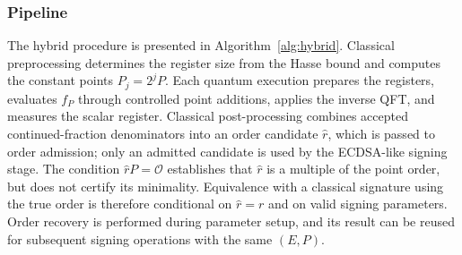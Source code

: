 \subsubsection{Pipeline}

\begin{revision}
The hybrid procedure is presented in Algorithm~\ref{alg:hybrid}. Classical preprocessing determines the register size from the Hasse bound and computes the constant points $P_j=2^jP$. Each quantum execution prepares the registers, evaluates $f_P$ through controlled point additions, applies the inverse QFT, and measures the scalar register. Classical post-processing combines accepted continued-fraction denominators into an order candidate $\hat r$, which is passed to order admission; only an admitted candidate is used by the ECDSA-like signing stage. The condition $\hat rP=\mathcal O$ establishes that $\hat r$ is a multiple of the point order, but does not certify its minimality. Equivalence with a classical signature using the true order is therefore conditional on $\hat r=r$ and on valid signing parameters. Order recovery is performed during parameter setup, and its result can be reused for subsequent signing operations with the same $(E,P)$.
\end{revision}

